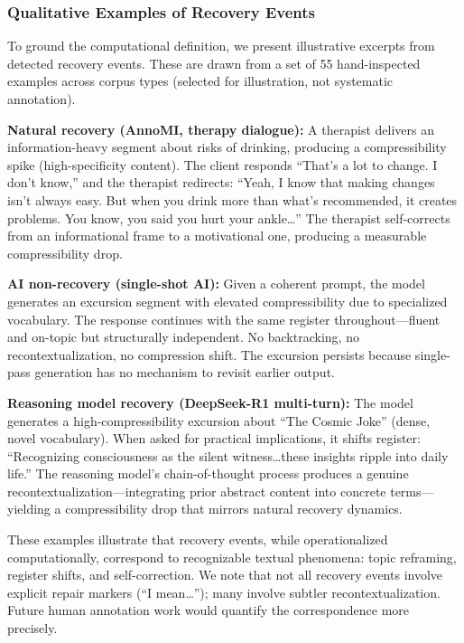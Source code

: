\documentclass[final]{clv2025}
\begin{document}
\subsubsection{Qualitative Examples of Recovery Events}
\label{sec:qualitative}

To ground the computational definition, we present illustrative excerpts from detected recovery events. These are drawn from a set of 55 hand-inspected examples across corpus types (selected for illustration, not systematic annotation).

\textbf{Natural recovery (AnnoMI, therapy dialogue):} A therapist delivers an information-heavy segment about risks of drinking, producing a compressibility spike (high-specificity content). The client responds ``That's a lot to change. I don't know,'' and the therapist redirects: ``Yeah, I know that making changes isn't always easy. But when you drink more than what's recommended, it creates problems. You know, you said you hurt your ankle\ldots'' The therapist self-corrects from an informational frame to a motivational one, producing a measurable compressibility drop.

\textbf{AI non-recovery (single-shot AI):} Given a coherent prompt, the model generates an excursion segment with elevated compressibility due to specialized vocabulary. The response continues with the same register throughout---fluent and on-topic but structurally independent. No backtracking, no recontextualization, no compression shift. The excursion persists because single-pass generation has no mechanism to revisit earlier output.

\textbf{Reasoning model recovery (DeepSeek-R1 multi-turn):} The model generates a high-compressibility excursion about ``The Cosmic Joke'' (dense, novel vocabulary). When asked for practical implications, it shifts register: ``Recognizing consciousness as the silent witness\ldots these insights ripple into daily life.'' The reasoning model's chain-of-thought process produces a genuine recontextualization---integrating prior abstract content into concrete terms---yielding a compressibility drop that mirrors natural recovery dynamics.

These examples illustrate that recovery events, while operationalized computationally, correspond to recognizable textual phenomena: topic reframing, register shifts, and self-correction. We note that not all recovery events involve explicit repair markers (``I mean\ldots''); many involve subtler recontextualization. Future human annotation work would quantify the correspondence more precisely.
\end{document}

